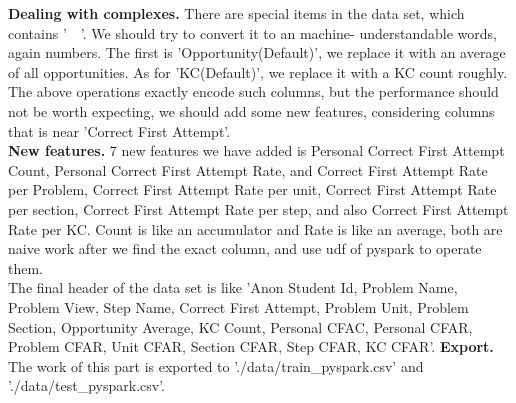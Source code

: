 \documentclass{article}
\begin{document}
\textbf{Dealing with complexes.}
There are special items in the data set, which contains '~~'. We should try to convert it to an machine- understandable words, again numbers. The first is 'Opportunity(Default)', we replace it with an average of all opportunities. As for 'KC(Default)', we replace it with a KC count roughly.\\
The above operations exactly encode such columns, but the performance should not be worth expecting, we should add some new features, considering columns that is near 'Correct First Attempt'.\\
\textbf{New features.} 7 new features we have added is Personal Correct First Attempt Count, Personal Correct First Attempt Rate, and Correct First Attempt Rate per Problem, Correct First Attempt Rate per unit, Correct First Attempt Rate per section, Correct First Attempt Rate per step, and also  Correct First Attempt Rate per KC. Count is like an accumulator and Rate is like an average, both are naive work after we find the exact column, and use udf of pyspark to operate them.\\
The final header of the data set is like 'Anon Student Id,	Problem Name,	Problem View,	Step Name,	Correct First Attempt,	Problem Unit,	Problem Section,	Opportunity Average,	KC Count,	Personal CFAC,	Personal CFAR,	Problem CFAR,	Unit CFAR,	Section CFAR,	Step CFAR,	KC CFAR'.
\textbf{Export.}
The work of this part is exported to './data/train\_pyspark.csv' and './data/test\_pyspark.csv'.
\end{document}
